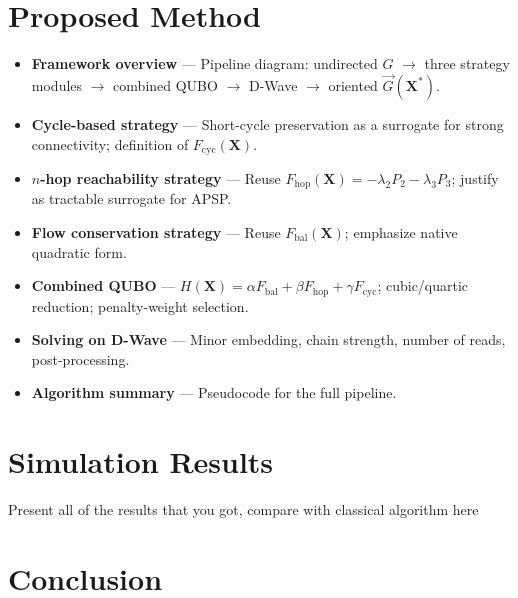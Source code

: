 \documentclass[twocolumn,a4paper]{article} %
\begin{document}
\section{Proposed Method} \label{sec:method}
\begin{itemize}
    \item \textbf{Framework overview} --- Pipeline diagram: undirected $G$ $\rightarrow$ three strategy modules $\rightarrow$ combined QUBO $\rightarrow$ D-Wave $\rightarrow$ oriented $\vec{G}(\mathbf{X}^{*})$.
    \item \textbf{Cycle-based strategy} --- Short-cycle preservation as a surrogate for strong connectivity; definition of $F_{\mathrm{cyc}}(\mathbf{X})$.
    \item \textbf{$n$-hop reachability strategy} --- Reuse $F_{\mathrm{hop}}(\mathbf{X})=-\lambda_2 P_2 - \lambda_3 P_3$; justify as tractable surrogate for APSP.
    \item \textbf{Flow conservation strategy} --- Reuse $F_{\mathrm{bal}}(\mathbf{X})$; emphasize native quadratic form.
    \item \textbf{Combined QUBO} --- $H(\mathbf{X}) = \alpha F_{\mathrm{bal}} + \beta F_{\mathrm{hop}} + \gamma F_{\mathrm{cyc}}$; cubic/quartic reduction; penalty-weight selection.
    \item \textbf{Solving on D-Wave} --- Minor embedding, chain strength, number of reads, post-processing.
    \item \textbf{Algorithm summary} --- Pseudocode for the full pipeline.
\end{itemize}

\section{Simulation Results} \label{sec:result}
Present all of the results that you got, compare with classical algorithm here
\section{Conclusion} \label{sec:conclusion}





\end{document}
